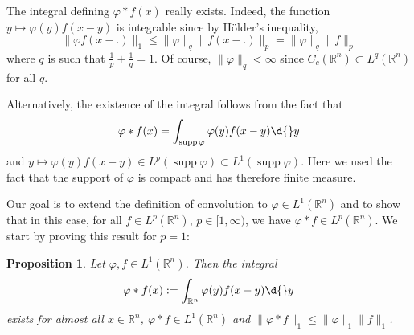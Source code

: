 \documentclass[12pt, oneside, a4paper]{article}
\newtheorem{prop}[thm]{Proposition}
\def\supp{\operatorname{supp}}
\theoremstyle{dfn}
\def\Rbb{\ensuremath{\mathbb{R}}}
\providecommand{\norm}[1]{\lVert#1\rVert}
\begin{document}
The integral defining $\varphi * f(x)$ really exists. Indeed, the function $y \mapsto \varphi(y)f(x-y)$ is integrable since by Hölder's inequality,
\[
\norm{\varphi f(x-.)}_1 \leqslant \norm{\varphi}_q \norm{f(x-.)}_p = \norm{\varphi}_q \norm{f}_p
\]
where $q$ is such that $\frac{1}{p} + \frac{1}{q} = 1$. Of course, $\norm{\varphi}_q < \infty$ since $C_c(\Rbb^n) \subset L^q(\Rbb^n)$ for all $q$.

Alternatively, the existence of the integral follows from the fact that
\[
\varphi * f(x) = \int_{\supp \varphi} \varphi(y) f(x-y) \d{}y
\]
and $y \mapsto \varphi(y) f(x-y) \in L^p(\supp \varphi) \subset L^1(\supp \varphi)$. Here we used the fact that the support of $\varphi$ is compact and has therefore finite measure.

Our goal is to extend the definition of convolution to $\varphi \in L^1(\Rbb^n)$ and to show that in this case, for all $f \in L^p(\Rbb^n)$, $p \in [1,\infty)$, we have $\varphi * f \in L^p(\Rbb^n)$. We start by proving this result for $p = 1$:

\begin{prop}\label{Prop:ConvolutionL1}
Let $\varphi, f \in L^1(\Rbb^n)$. Then the integral
\[
\varphi * f(x)
:= \int_{\Rbb^n} \varphi(y) f(x-y) \d{}y
\]
exists for almost all $x \in \Rbb^n$, $\varphi * f \in L^1(\Rbb^n)$ and $\norm{\varphi * f}_1 \leqslant \norm{\varphi}_1 \norm{f}_1$.
\end{prop}
\end{document}
